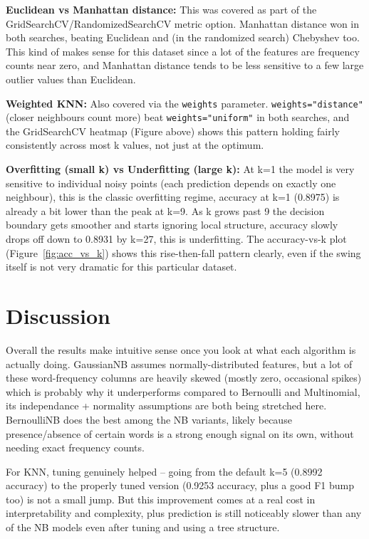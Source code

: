 \documentclass[12pt,a4paper]{article}
\begin{document}
\textbf{Euclidean vs Manhattan distance:} This was covered as part of the GridSearchCV/RandomizedSearchCV metric option. Manhattan distance won in both searches, beating Euclidean and (in the randomized search) Chebyshev too. This kind of makes sense for this dataset since a lot of the features are frequency counts near zero, and Manhattan distance tends to be less sensitive to a few large outlier values than Euclidean.

\textbf{Weighted KNN:} Also covered via the \texttt{weights} parameter. \texttt{weights="distance"} (closer neighbours count more) beat \texttt{weights="uniform"} in both searches, and the GridSearchCV heatmap (Figure above) shows this pattern holding fairly consistently across most k values, not just at the optimum.

\textbf{Overfitting (small k) vs Underfitting (large k):} At k=1 the model is very sensitive to individual noisy points (each prediction depends on exactly one neighbour), this is the classic overfitting regime, accuracy at k=1 (0.8975) is already a bit lower than the peak at k=9. As k grows past 9 the decision boundary gets smoother and starts ignoring local structure, accuracy slowly drops off down to 0.8931 by k=27, this is underfitting. The accuracy-vs-k plot (Figure~\ref{fig:acc_vs_k}) shows this rise-then-fall pattern clearly, even if the swing itself is not very dramatic for this particular dataset.

\section{Discussion}
Overall the results make intuitive sense once you look at what each algorithm is actually doing. GaussianNB assumes normally-distributed features, but a lot of these word-frequency columns are heavily skewed (mostly zero, occasional spikes) which is probably why it underperforms compared to Bernoulli and Multinomial, its independance + normality assumptions are both being stretched here. BernoulliNB does the best among the NB variants, likely because presence/absence of certain words is a strong enough signal on its own, without needing exact frequency counts.

For KNN, tuning genuinely helped -- going from the default k=5 (0.8992 accuracy) to the properly tuned version (0.9253 accuracy, plus a good F1 bump too) is not a small jump. But this improvement comes at a real cost in interpretability and complexity, plus prediction is still noticeably slower than any of the NB models even after tuning and using a tree structure.
\end{document}
